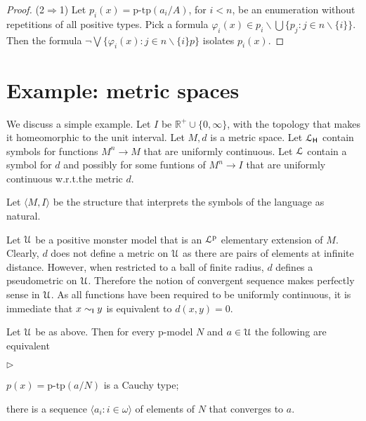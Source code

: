 \documentclass[10pt,oneside]{amsproc}
\newcommand{\mylabel}[1]{{#1}\hfill}
\renewenvironment{itemize}
  {\begin{list}{$\triangleright$}{%
  \setlength{\parskip}{0mm}
  \setlength{\topsep}{.4\baselineskip}
  \setlength{\rightmargin}{0mm}
  \setlength{\listparindent}{0mm}
  \setlength{\itemindent}{0mm}
  \setlength{\labelwidth}{3ex}
  \setlength{\itemsep}{.2\baselineskip}
  \setlength{\parsep}{.2\baselineskip}
  \setlength{\partopsep}{0mm}
  \setlength{\labelsep}{1ex}
  \setlength{\leftmargin}{\labelwidth+\labelsep}
  \let\makelabel\mylabel}}{%
\end{list}}
\begin{document}
{\begin{proof}
  (2$\Rightarrow$1)
  Let $p_i(x)=\mbox{p-tp}(a_i/A)$, for $i<n$, be an enumeration without repetitions of all positive types.
  Pick a formula $\varphi_i(x)\in p_i\smallsetminus\bigcup\big\{ p_j : j\in n\smallsetminus\{i\}\big\}$.
  Then the formula $\neg\bigvee\big\{\varphi_i(x):j\in n\smallsetminus\{i\}p\big\}$ isolates $p_i(x)$.
\end{proof}



\section{Example: metric spaces}

We discuss a simple example.
Let $I$ be $\mathds{R}^+\cup\{0,\infty\}$, with the topology that makes it homeomorphic to the unit interval.
Let $M,d$ is a metric space.
Let ${\EuScript L}_{\sf H}$ contain symbols for functions $M^n\to M$ that are uniformly continuous.
Let ${\EuScript L}$ contain a symbol for $d$ and possibly for some funtions of $M^n\to I$ that are uniformly continuous w.r.t.\@ the metric $d$.

Let $\langle M,I\rangle$ be the structure that interprets the symbols of the language as natural.

Let ${\EuScript U}$ be a positive monster model that is  an ${\EuScript L}^{\rm p}$ elementary extension of $M$.
Clearly, $d$ does not define a metric on ${\EuScript U}$ as there are pairs of elements at infinite distance.
However, when restricted to a ball of finite radius, $d$ defines a pseudometric on ${\EuScript U}$.
Therefore the notion of convergent sequence makes perfectly sense in ${\EuScript U}$.
As all functions have been required to be uniformly continuous, it is immediate that $x\sim_{\sf I}y$ is equivalent to $d(x,y)=0$.

\begin{fact}
  Let $ {\EuScript U}$ be as above.
  Then for every p-model $N$ and $a\in{\EuScript U}$ the following are equivalent
  \begin{itemize}
    \item[1.] $p(x)=\mbox{p-tp}(a/N)$ is a Cauchy type;
    \item[2.] there is a sequence $\langle a_i: i\in\omega\rangle$ of elements of $N$ that converges to $a$.
  \end{itemize} 
\end{fact}

}
\end{document}
